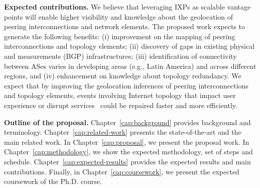 
	\textbf{Expected contributions.} We believe that leveraging IXPs as scalable vantage points will enable higher visibility and knowledge about the geolocation of peering interconnections and network elements. The proposed work expects to generate the following benefits: (i) improvement on the mapping of peering interconnections and topology elements; (ii) discovery of gaps in existing physical and measurements (BGP) infrastructures; (iii) identification of connectivity between ASes varies in developing areas (e.g., Latin America) and across different regions, and (iv) enhancement on knowledge about topology redundancy. We expect that by improving the geolocation inferences of peering interconnections and topology elements, events involving Internet topology that impact user experience or disrupt services~\cite{routerDMV, routerUnited, facebookCDN} could be repaired faster and more efficiently.

	\textbf{Outline of the proposal.} Chapter~\ref{cap:background} provides background and terminology. Chapter~\ref{cap:related-work} presents the state-of-the-art and the main related work. In Chapter~\ref{cap:proposal}, we present the proposal work. In Chapter~\ref{cap:methodology}, we show the expected methodology, set of steps and schedule. Chapter~\ref{cap:expected-results} provides the expected results and main contributions. Finally, in Chapter~\ref{cap:coursework}, we present the expected coursework of the Ph.D. course.


